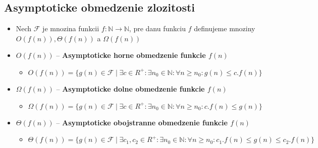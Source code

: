 \documentclass[12pt]{article}
\newcommand{\pipesep}{\hspace{3pt} \vert \hspace{3pt}}
\begin{document}
\subsection*{Asymptoticke obmedzenie zlozitosti}
\begin{itemize}
	\item Nech $\mathcal{F}$ je mnozina funkcii $f: \mathbb{N} \to \mathbb{N}$, pre danu funkciu $f$ definujeme mnoziny
		$O(f(n)), \Theta(f(n))$ a $\Omega(f(n))$
	\item $O(f(n))$ -- \textbf{Asymptoticke horne obmedzenie funkcie $f(n)$}
		\begin{itemize}
			\item $O(f(n)) = \{g(n) \in \mathcal{F} \pipesep \exists c \in R^{+}:\exists n_{0} \in \mathbb{N}: \forall n\ge n_{0}: g(n) \le c.f(n)\}$
		\end{itemize}
	\item $\Omega(f(n))$ -- \textbf{Asymptoticke dolne obmedzenie funkcie $f(n)$}
		\begin{itemize}
			\item $\Omega(f(n)) = \{g(n) \in \mathcal{F} \pipesep \exists c \in R^{+}:\exists n_{0} \in \mathbb{N}: \forall n\ge n_{0}: c.f(n) \le g(n)\}$
		\end{itemize}
	\item $\Theta(f(n))$ -- \textbf{Asymptoticke obojstranne obmedzenie funkcie $f(n)$}
		\begin{itemize}
			\item $\Theta(f(n)) = \{g(n) \in \mathcal{F} \pipesep \exists c_{1},c_{2} \in R^{+}:\exists n_{0} \in \mathbb{N}: \forall n\ge n_{0}: c_{1}.f(n) \le g(n) \le c_{2}.f(n)\}$
		\end{itemize}
\end{itemize}
\end{document}
